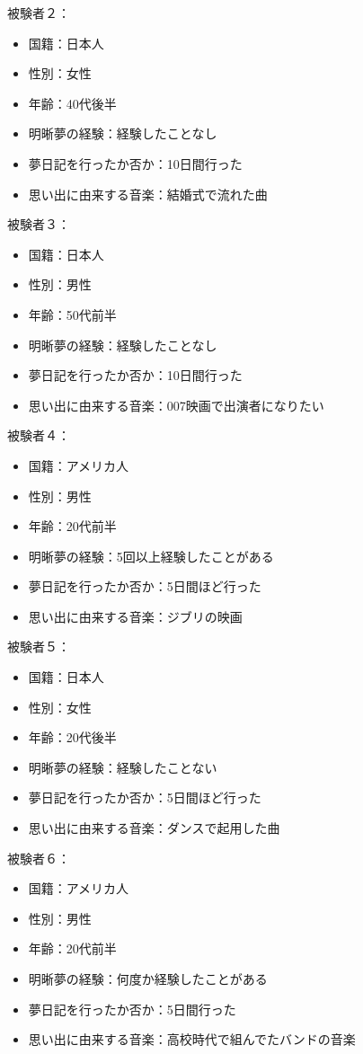 被験者２：
\begin{itemize}
\item 国籍：日本人
\item 性別：女性
\item 年齢：40代後半
\item 明晰夢の経験：経験したことなし
\item 夢日記を行ったか否か：10日間行った
\item 思い出に由来する音楽：結婚式で流れた曲
\end{itemize}

被験者３：
\begin{itemize}
\item 国籍：日本人
\item 性別：男性
\item 年齢：50代前半
\item 明晰夢の経験：経験したことなし
\item 夢日記を行ったか否か：10日間行った
\item 思い出に由来する音楽：007映画で出演者になりたい
\end{itemize}

被験者４：
\begin{itemize}
\item 国籍：アメリカ人
\item 性別：男性
\item 年齢：20代前半
\item 明晰夢の経験：5回以上経験したことがある
\item 夢日記を行ったか否か：5日間ほど行った
\item 思い出に由来する音楽：ジブリの映画
\end{itemize}

被験者５：
\begin{itemize}
\item 国籍：日本人
\item 性別：女性
\item 年齢：20代後半
\item 明晰夢の経験：経験したことない
\item 夢日記を行ったか否か：5日間ほど行った
\item 思い出に由来する音楽：ダンスで起用した曲
\end{itemize}


被験者６：
\begin{itemize}
\item 国籍：アメリカ人
\item 性別：男性
\item 年齢：20代前半
\item 明晰夢の経験：何度か経験したことがある
\item 夢日記を行ったか否か：5日間行った
\item 思い出に由来する音楽：高校時代で組んでたバンドの音楽
\end{itemize}

